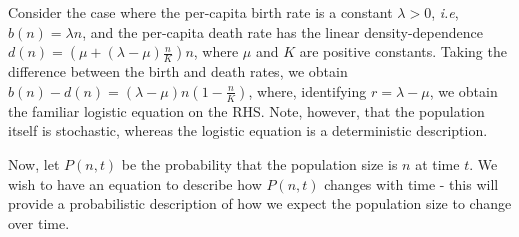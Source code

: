 \begin{example}\label{ex_1D_stoch_logistic}
	Consider the case where the per-capita birth rate is a constant $\lambda > 0$, \emph{i.e}, $b(n) = \lambda n$, and the per-capita death rate has the linear density-dependence $d(n) = \left(\mu + (\lambda-\mu)\frac{n}{K}\right)n$, where $\mu$ and $K$ are positive constants. Taking the difference between the birth and death rates, we obtain $b(n) - d(n) = (\lambda - \mu)n\left(1-\frac{n}{K}\right)$, where, identifying $r=\lambda-\mu$, we obtain the familiar logistic equation on the RHS. Note, however, that the population itself is stochastic, whereas the logistic equation is a deterministic description.
\end{example}
Now, let $P(n,t)$ be the probability that the population size is $n$ at time $t$. We wish to have an equation to describe how $P(n,t)$ changes with time - this will provide a probabilistic description of how we expect the population size to change over time.


